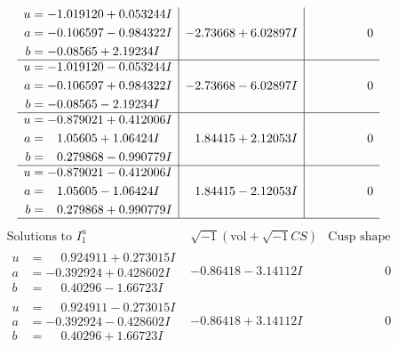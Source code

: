\documentclass[1p]{elsarticle_modified}
\theoremstyle{definition}
\newcommand{\I}{\sqrt{-1}}
\begin{document}
$$\begin{array}{c|c|c}
\begin{aligned}
u &= -1.019120 + 0.053244 I \\
a &= -0.106597 - 0.984322 I \\
b &= -0.08565 + 2.19234 I\end{aligned}
 & -2.73668 + 6.02897 I & \phantom{-0.000000 } 0 \\ \hline\begin{aligned}
u &= -1.019120 - 0.053244 I \\
a &= -0.106597 + 0.984322 I \\
b &= -0.08565 - 2.19234 I\end{aligned}
 & -2.73668 - 6.02897 I & \phantom{-0.000000 } 0 \\ \hline\begin{aligned}
u &= -0.879021 + 0.412006 I \\
a &= \phantom{-}1.05605 + 1.06424 I \\
b &= \phantom{-}0.279868 - 0.990779 I\end{aligned}
 & \phantom{-}1.84415 + 2.12053 I & \phantom{-0.000000 } 0 \\ \hline\begin{aligned}
u &= -0.879021 - 0.412006 I \\
a &= \phantom{-}1.05605 - 1.06424 I \\
b &= \phantom{-}0.279868 + 0.990779 I\end{aligned}
 & \phantom{-}1.84415 - 2.12053 I & \phantom{-0.000000 } 0\\
 \hline 
 \end{array}$$\newpage$$\begin{array}{c|c|c}  
\text{Solutions to }I^u_{1}& \I (\text{vol} + \sqrt{-1}CS) & \text{Cusp shape}\\
 \hline 
\begin{aligned}
u &= \phantom{-}0.924911 + 0.273015 I \\
a &= -0.392924 + 0.428602 I \\
b &= \phantom{-}0.40296 - 1.66723 I\end{aligned}
 & -0.86418 - 3.14112 I & \phantom{-0.000000 } 0 \\ \hline\begin{aligned}
u &= \phantom{-}0.924911 - 0.273015 I \\
a &= -0.392924 - 0.428602 I \\
b &= \phantom{-}0.40296 + 1.66723 I\end{aligned}
 & -0.86418 + 3.14112 I & \phantom{-0.000000 } 0 \\ \hline\begin{aligned}

\end{aligned}
\end{array}$$
\end{document}
